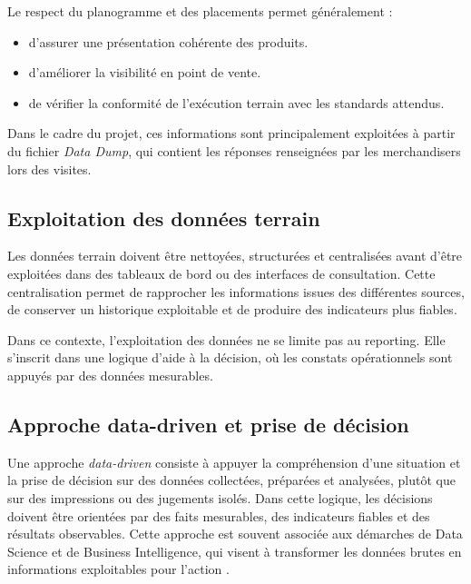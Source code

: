Le respect du planogramme et des placements permet généralement :

\begin{itemize}
    \item d’assurer une présentation cohérente des produits.
    \item d’améliorer la visibilité en point de vente.
    \item de vérifier la conformité de l’exécution terrain avec les standards attendus.
\end{itemize}

Dans le cadre du projet, ces informations sont principalement exploitées à partir du fichier \textit{Data Dump}, qui contient les réponses renseignées par les merchandisers lors des visites.


\subsection{Exploitation des données terrain}

Les données terrain doivent être nettoyées, structurées et centralisées avant d’être exploitées dans des tableaux de bord ou des interfaces de consultation. Cette centralisation permet de rapprocher les informations issues des différentes sources, de conserver un historique exploitable et de produire des indicateurs plus fiables.

Dans ce contexte, l’exploitation des données ne se limite pas au reporting. Elle s’inscrit dans une logique d’aide à la décision, où les constats opérationnels sont appuyés par des données mesurables.

\subsection{Approche data-driven et prise de décision}

Une approche \textit{data-driven} consiste à appuyer la compréhension d’une situation et la prise de décision sur des données collectées, préparées et analysées, plutôt que sur des impressions ou des jugements isolés. Dans cette logique, les décisions doivent être orientées par des faits mesurables, des indicateurs fiables et des résultats observables. Cette approche est souvent associée aux démarches de Data Science et de Business Intelligence, qui visent à transformer les données brutes en informations exploitables pour l’action \cite{provost-fawcett-2013}.

